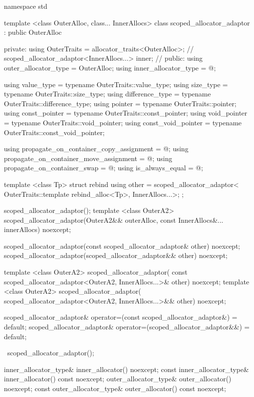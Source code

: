 %
\begin{codeblock}
namespace std {
  template <class OuterAlloc, class... InnerAllocs>
    class scoped_allocator_adaptor : public OuterAlloc {
  private:
    using OuterTraits = allocator_traits<OuterAlloc>; // \expos
    scoped_allocator_adaptor<InnerAllocs...> inner;   // \expos
  public:
    using outer_allocator_type = OuterAlloc;
    using inner_allocator_type = @\seebelow@;

    using value_type           = typename OuterTraits::value_type;
    using size_type            = typename OuterTraits::size_type;
    using difference_type      = typename OuterTraits::difference_type;
    using pointer              = typename OuterTraits::pointer;
    using const_pointer        = typename OuterTraits::const_pointer;
    using void_pointer         = typename OuterTraits::void_pointer;
    using const_void_pointer   = typename OuterTraits::const_void_pointer;

    using propagate_on_container_copy_assignment = @\seebelow@;
    using propagate_on_container_move_assignment = @\seebelow@;
    using propagate_on_container_swap            = @\seebelow@;
    using is_always_equal                        = @\seebelow@;

    template <class Tp>
      struct rebind {
        using other = scoped_allocator_adaptor<
          OuterTraits::template rebind_alloc<Tp>, InnerAllocs...>;
      };

    scoped_allocator_adaptor();
    template <class OuterA2>
      scoped_allocator_adaptor(OuterA2&& outerAlloc,
                               const InnerAllocs&... innerAllocs) noexcept;

    scoped_allocator_adaptor(const scoped_allocator_adaptor& other) noexcept;
    scoped_allocator_adaptor(scoped_allocator_adaptor&& other) noexcept;

    template <class OuterA2>
      scoped_allocator_adaptor(
        const scoped_allocator_adaptor<OuterA2, InnerAllocs...>& other) noexcept;
    template <class OuterA2>
      scoped_allocator_adaptor(
        scoped_allocator_adaptor<OuterA2, InnerAllocs...>&& other) noexcept;

    scoped_allocator_adaptor& operator=(const scoped_allocator_adaptor&) = default;
    scoped_allocator_adaptor& operator=(scoped_allocator_adaptor&&) = default;

    ~scoped_allocator_adaptor();

    inner_allocator_type& inner_allocator() noexcept;
    const inner_allocator_type& inner_allocator() const noexcept;
    outer_allocator_type& outer_allocator() noexcept;
    const outer_allocator_type& outer_allocator() const noexcept;

}}
\end{codeblock}
